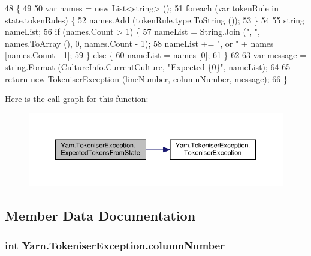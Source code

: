 \begin{DoxyCode}
48                                                                                                            
                       \{
49 
50             var names = \textcolor{keyword}{new} List<string> ();
51             \textcolor{keywordflow}{foreach} (var tokenRule \textcolor{keywordflow}{in} state.tokenRules) \{
52                 names.Add (tokenRule.type.ToString ());
53             \}
54 
55             \textcolor{keywordtype}{string} nameList;
56             \textcolor{keywordflow}{if} (names.Count > 1) \{
57                 nameList = String.Join (\textcolor{stringliteral}{", "}, names.ToArray (), 0, names.Count - 1);
58                 nameList += \textcolor{stringliteral}{", or "} + names [names.Count - 1];
59             \} \textcolor{keywordflow}{else} \{
60                 nameList = names [0];
61             \}
62 
63             var message = string.Format (CultureInfo.CurrentCulture, \textcolor{stringliteral}{"Expected \{0\}"}, nameList);
64 
65             \textcolor{keywordflow}{return} \textcolor{keyword}{new} \hyperlink{a00174_ad00fcf742d2b0d476ce43b27a3f3b6c1}{TokeniserException} (\hyperlink{a00174_a54b936d7b4f26f88a07a66c5fc1d1ad1}{lineNumber}, 
      \hyperlink{a00174_aabf2ad38f3984297c1daede9be55e3d6}{columnNumber}, message);
66         \}
\end{DoxyCode}


Here is the call graph for this function\-:
\nopagebreak
\begin{figure}[H]
\begin{center}
\leavevmode
\includegraphics[width=350pt]{a00174_af88cfa5eafdee355e1abb67e358497bd_cgraph}
\end{center}
\end{figure}




\subsection{Member Data Documentation}
\hypertarget{a00174_aabf2ad38f3984297c1daede9be55e3d6}{
\subsubsection[{column\-Number}]{\setlength{\rightskip}{0pt plus 5cm}int Yarn.\-Tokeniser\-Exception.\-column\-Number}}\label{a00174_aabf2ad38f3984297c1daede9be55e3d6}



